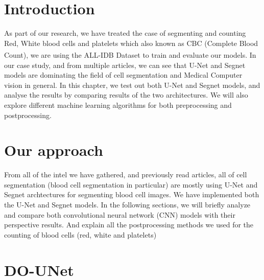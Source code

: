 \section{Introduction}
\vspace{0.2in}
\hspace*{0.16in}
As part of our research, we have treated the case of segmenting and counting Red, White blood cells and platelets which also known as CBC (Complete Blood Count), we are using the ALL-IDB\textsuperscript{\cite{pm77-2n23-20}} Dataset to train and evaluate our models.
In our case study, and from multiple articles, we can see that U-Net and Segnet models are dominating the field of cell segmentation and Medical Computer vision in general.
In this chapter, we test out both U-Net and Segnet models, and analyse the results by comparing results of the two architectures.
We will also explore different machine learning algorithms for both preprocessing and postprocessing.

\section{Our approach}
\vspace{0.2in}
\hspace*{0.16in}
From all of the intel we have gathered, and previously read articles, all of cell segmentation (blood cell segmentation in particular) are mostly using U-Net and Segnet archtectures for segmenting blood cell images.
We have implemented both the U-Net and Segnet models.
In the following sections, we will briefly analyze and compare both convolutional neural network (CNN) models with their perspective results.
And explain all the postprocessing methods we used for the counting of blood cells (red, white and platelets)

\section{DO-UNet}
